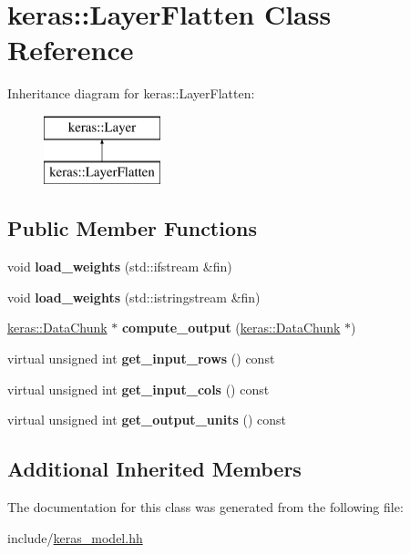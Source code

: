 \hypertarget{classkeras_1_1_layer_flatten}{}\section{keras\+:\+:Layer\+Flatten Class Reference}
\label{classkeras_1_1_layer_flatten}
Inheritance diagram for keras\+:\+:Layer\+Flatten\+:\begin{figure}[H]
\begin{center}
\leavevmode
\includegraphics[height=2.000000cm]{classkeras_1_1_layer_flatten}
\end{center}
\end{figure}
\subsection*{Public Member Functions}
\begin{DoxyCompactItemize}
\item 
\mbox{\label{classkeras_1_1_layer_flatten_aa936243f0eaf34583fabcfdb5fe1fefa}} 
void {\bfseries load\+\_\+weights} (std\+::ifstream \&fin)
\item 
\mbox{\label{classkeras_1_1_layer_flatten_a38409a8de78d8858352c271df19090f8}} 
void {\bfseries load\+\_\+weights} (std\+::istringstream \&fin)
\item 
\mbox{\label{classkeras_1_1_layer_flatten_a0bc9b398a2d47786cbfd74c6fd77bc26}} 
\mbox{\hyperlink{classkeras_1_1_data_chunk}{keras\+::\+Data\+Chunk}} $\ast$ {\bfseries compute\+\_\+output} (\mbox{\hyperlink{classkeras_1_1_data_chunk}{keras\+::\+Data\+Chunk}} $\ast$)
\item 
\mbox{\label{classkeras_1_1_layer_flatten_aea54f55b7b342ab2c96417c079023ac7}} 
virtual unsigned int {\bfseries get\+\_\+input\+\_\+rows} () const
\item 
\mbox{\label{classkeras_1_1_layer_flatten_a896a30c4d1c47abc8c08699b4ea67e11}} 
virtual unsigned int {\bfseries get\+\_\+input\+\_\+cols} () const
\item 
\mbox{\label{classkeras_1_1_layer_flatten_aa579165e501880f3de1938e972077003}} 
virtual unsigned int {\bfseries get\+\_\+output\+\_\+units} () const
\end{DoxyCompactItemize}
\subsection*{Additional Inherited Members}


The documentation for this class was generated from the following file\+:\begin{DoxyCompactItemize}
\item 
include/\mbox{\hyperlink{keras__model_8hh}{keras\+\_\+model.\+hh}}\end{DoxyCompactItemize}
